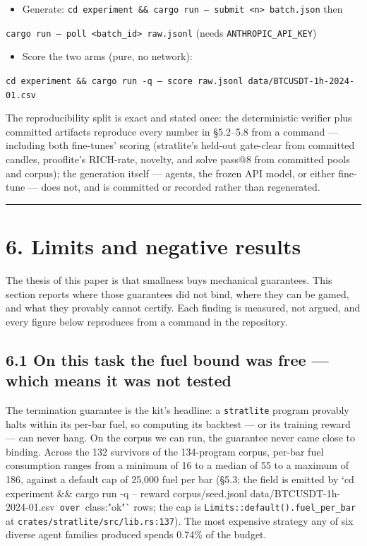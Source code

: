 \documentclass[11pt]{article}
\newcommand{\code}[1]{\texttt{#1}}
\begin{document}
\begin{itemize}[leftmargin=*]
\item Generate: \code{cd experiment \&\& cargo run -- submit <n> batch.json} then
\end{itemize}
  \code{cargo run -- poll <batch\_id> raw.jsonl} (needs \code{ANTHROPIC\_API\_KEY})
\begin{itemize}[leftmargin=*]
\item Score the two arms (pure, no network):
\end{itemize}
  \code{cd experiment \&\& cargo run -q -- score raw.jsonl data/BTCUSDT-1h-2024-01.csv}

The reproducibility split is exact and stated once: the deterministic verifier
plus committed artifacts reproduce every number in \S{}5.2--5.8 from a command ---
including both fine-tunes' scoring (stratlite's held-out gate-clear from committed
candles, prooflite's RICH-rate, novelty, and solve pass@8 from committed pools
and corpus); the
generation itself --- agents, the frozen API model, or either fine-tune --- does not,
and is committed or recorded rather than regenerated.

\bigskip\hrule\bigskip

\section*{6. Limits and negative results}

The thesis of this paper is that smallness buys mechanical guarantees. This
section reports where those guarantees did not bind, where they can be gamed,
and what they provably cannot certify. Each finding is measured, not argued, and
every figure below reproduces from a command in the repository.

\subsection*{6.1 On this task the fuel bound was free --- which means it was not tested}

The termination guarantee is the kit's headline: a \code{stratlite} program provably
halts within its per-bar fuel, so computing its backtest --- or its training
reward --- can never hang. On the corpus we can run, the guarantee never came
close to binding. Across the 132 survivors of the 134-program corpus, per-bar
fuel consumption ranges from a minimum of 16 to a median of 55 to a maximum of
186, against a default cap of 25,000 fuel per bar (\S{}5.3; the field is emitted by
`cd experiment \&\& cargo run -q -- reward corpus/seed.jsonl
data/BTCUSDT-1h-2024-01.csv\code{ over }class:"ok"` rows; the cap is
\code{Limits::default().fuel\_per\_bar} at \code{crates/stratlite/src/lib.rs:137}). The most
expensive strategy any of six diverse agent families produced spends 0.74\% of
the budget.
\end{document}
